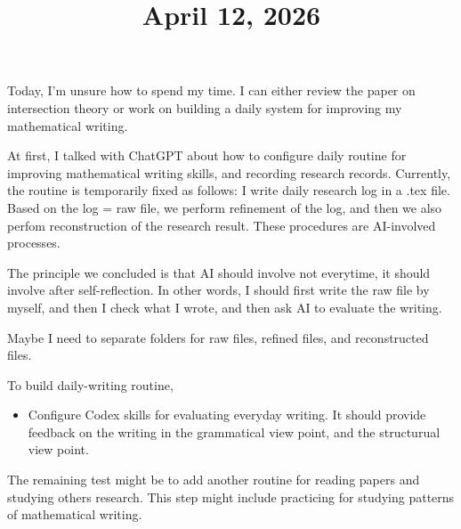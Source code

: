 \documentclass[11pt]{amsart}
\title{April 12, 2026}
\begin{document}
\maketitle

Today, I’m unsure how to spend my time. I can either review the paper on intersection theory or work on building a daily system for improving my mathematical writing.
\par\vspace{1em}
At first, I talked with ChatGPT about how to configure daily routine for improving mathematical writing skills, and recording research records.
Currently, the routine is temporarily fixed as follows: I write daily research log in a .tex file.
Based on the log = raw file, we perform refinement of the log, and then we also perfom reconstruction of the research result.
These procedures are AI-involved processes.

The principle we concluded is that AI should involve not everytime, it should involve after self-reflection.
In other words, I should first write the raw file by myself, and then I check what I wrote, and then ask AI to evaluate the writing. 

Maybe I need to separate folders for raw files, refined files, and reconstructed files.

\par\vspace{1em}
\begin{todo} To build daily-writing routine,
    \begin{itemize}
        \item Configure Codex skills for evaluating everyday writing.
        It should provide feedback on the writing in the grammatical view point, and the structurual view point.
    \end{itemize}    
\end{todo}

The remaining test might be to add another routine for reading papers and studying others research.
This step might include practicing for studying patterns of mathematical writing.






\end{document}
